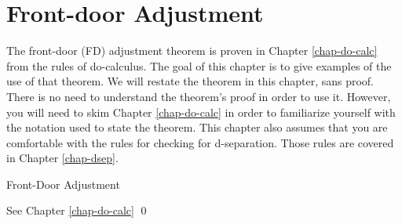 \chapter{Front-door Adjustment}
\label{chap-fdoor}
The front-door (FD) adjustment
theorem is proven in 
Chapter \ref{chap-do-calc}
from the rules of do-calculus.
The goal 
of this chapter is
to give examples
of the use of that
theorem. We will restate
the theorem in this chapter,
sans proof.
There is no need
to understand the
theorem's
proof in order to use it.
However, you
will
need to skim Chapter \ref{chap-do-calc}
in order to familiarize 
yourself with
the notation used to state the 
theorem.
This chapter also assumes
that you are comfortable 
with the  rules 
for checking for d-separation. Those rules
are covered in Chapter \ref{chap-dsep}.


\fdoordef

\begin{claim} Front-Door Adjustment
\fdoorclaim

\end{claim}
\proof 
See Chapter \ref{chap-do-calc}
\qed
